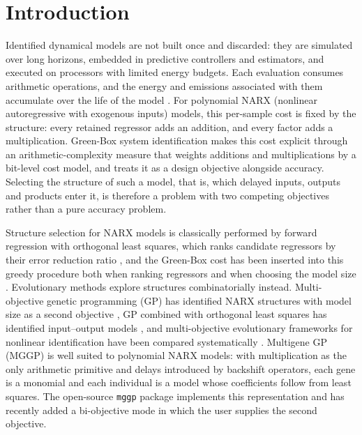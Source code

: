 \section{Introduction}\label{sec:intro}

Identified dynamical models are not built once and discarded: they are simulated over long horizons, embedded in
predictive controllers and estimators, and executed on processors with limited energy budgets. Each evaluation
consumes arithmetic operations, and the energy and emissions associated with them accumulate over the life of the
model \cite{PWG2018,LGI2021}. For polynomial NARX (nonlinear autoregressive with exogenous inputs) models, this
per-sample cost is fixed by the structure: every retained regressor adds an addition, and every factor adds a
multiplication. Green-Box system identification \cite{NMN2023,NZBN2026} makes this cost explicit through an
arithmetic-complexity measure that weights additions and multiplications by a bit-level cost model, and treats it as
a design objective alongside accuracy. Selecting the structure of such a model, that is, which delayed inputs,
outputs and products enter it, is therefore a problem with two competing objectives rather than a pure accuracy
problem.

Structure selection for NARX models is classically performed by forward regression with orthogonal least squares,
which ranks candidate regressors by their error reduction ratio \cite{KBLM1988,Bil2013}, and the Green-Box cost has
been inserted into this greedy procedure both when ranking regressors and when choosing the model size
\cite{NMN2026GB}. Evolutionary methods explore structures combinatorially instead. Multi-objective genetic
programming (GP) has identified NARX structures with model size as a second objective \cite{RFF2004}, GP combined with
orthogonal least squares has identified input--output models \cite{MAS2005}, and multi-objective evolutionary
frameworks for nonlinear identification have been compared systematically \cite{HSM2020}. Multigene GP (MGGP)
\cite{HHM+1996,SLW2010} is well suited to polynomial NARX models: with multiplication as the only arithmetic
primitive and delays introduced by backshift operators, each gene is a monomial and each individual is a model whose
coefficients follow from least squares. The open-source \texttt{mggp} package \cite{mggpy} implements this
representation and has recently added a bi-objective mode in which the user supplies the second objective.

